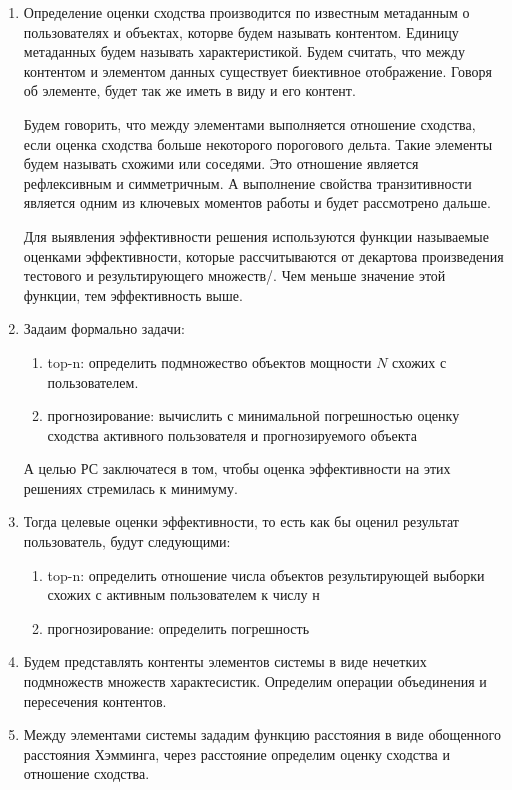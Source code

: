 \documentclass[a4paper,14pt]{proc}
\begin{document}
{\begin{enumerate}
\item Определение оценки сходства производится по известным метаданным о пользователях и объектах,
которве будем называть контентом. Единицу метаданных будем называть характеристикой.
Будем считать, что между контентом и элементом данных существует биективное отображение.
Говоря об элементе, будет так же иметь в виду и его контент. 

Будем говорить, что между элементами выполняется отношение сходства,
если оценка сходства больше некоторого порогового дельта. Такие элементы будем называть схожими или соседями. 
Это отношение является рефлексивным и симметричным. А выполнение свойства транзитивности является одним из 
ключевых моментов работы и будет рассмотрено дальше.

Для выявления эффективности решения используются функции называемые оценками эффективности, которые
рассчитываются от декартова произведения тестового и результирующего множеств/. Чем меньше значение этой
функции, тем эффективность выше.

\item Задаим формально задачи:
\begin{enumerate}
\item top-n: определить подмножество объектов мощности $N$ схожих с пользователем. 
\item прогнозирование: вычислить с минимальной погрешностью оценку сходства активного пользователя и прогнозируемого объекта 
\end{enumerate}
А целью РС заключатеся в том, чтобы оценка эффективности на этих решениях стремилась к минимуму.

\item Тогда целевые оценки эффективности, то есть как бы оценил результат пользователь, будут следующими:
\begin{enumerate}
\item top-n: определить отношение числа объектов результирующей выборки схожих с активным пользователем к числу н
\item прогнозирование: определить погрешность
\end{enumerate}

%
%

\item Будем представлять контенты элементов системы в виде нечетких подмножеств множеств характесистик.
Определим операции объединения и пересечения контентов.

\item Между элементами системы зададим функцию расстояния в виде обощенного расстояния Хэмминга, через расстояние
определим оценку сходства и отношение сходства.


\end{enumerate}}
\end{document}
